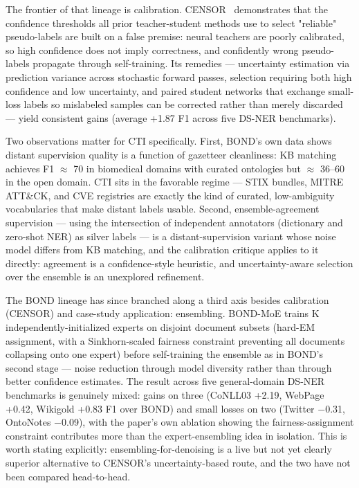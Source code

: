 \documentclass[11pt]{article}
\begin{document}
The frontier of that lineage is calibration. CENSOR~\citep{si2023improving} demonstrates that the confidence thresholds all prior teacher-student methods use to select "reliable" pseudo-labels are built on a false premise: neural teachers are poorly calibrated, so high confidence does not imply correctness, and confidently wrong pseudo-labels propagate through self-training. Its remedies — uncertainty estimation via prediction variance across stochastic forward passes, selection requiring both high confidence and low uncertainty, and paired student networks that exchange small-loss labels so mislabeled samples can be corrected rather than merely discarded — yield consistent gains (average +1.87 F1 across five DS-NER benchmarks).

Two observations matter for CTI specifically. First, BOND's own data shows distant supervision quality is a function of gazetteer cleanliness: KB matching achieves F1 $\approx$ 70 in biomedical domains with curated ontologies but $\approx$ 36–60 in the open domain. CTI sits in the favorable regime — STIX bundles, MITRE ATT\&CK, and CVE registries are exactly the kind of curated, low-ambiguity vocabularies that make distant labels usable. Second, ensemble-agreement supervision — using the intersection of independent annotators (dictionary and zero-shot NER) as silver labels — is a distant-supervision variant whose noise model differs from KB matching, and the calibration critique applies to it directly: agreement is a confidence-style heuristic, and uncertainty-aware selection over the ensemble is an unexplored refinement.

The BOND lineage has since branched along a third axis besides calibration (CENSOR) and case-study application: ensembling. BOND-MoE trains K independently-initialized experts on disjoint document subsets (hard-EM assignment, with a Sinkhorn-scaled fairness constraint preventing all documents collapsing onto one expert) before self-training the ensemble as in BOND's second stage — noise reduction through model diversity rather than through better confidence estimates. The result across five general-domain DS-NER benchmarks is genuinely mixed: gains on three (CoNLL03 +2.19, WebPage +0.42, Wikigold +0.83 F1 over BOND) and small losses on two (Twitter $-$0.31, OntoNotes $-$0.09), with the paper's own ablation showing the fairness-assignment constraint contributes more than the expert-ensembling idea in isolation. This is worth stating explicitly: ensembling-for-denoising is a live but not yet clearly superior alternative to CENSOR's uncertainty-based route, and the two have not been compared head-to-head.
\end{document}
